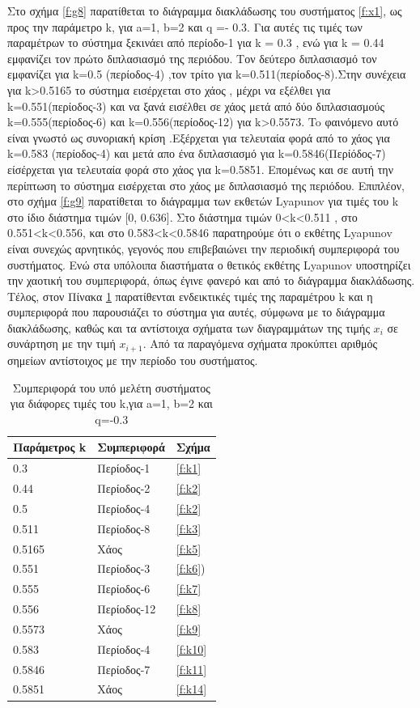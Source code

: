 Στο σχήμα \ref{f:g8} παρατίθεται το διάγραμμα διακλάδωσης του συστήματος \ref{f:x1}, ως προς την παράμετρο k, για a=1, b=2 και q =- 0.3. Για αυτές τις τιμές των παραμέτρων το σύστημα ξεκινάει από περίοδο-1 για k = 0.3 , ενώ για  k = 0.44 εμφανίζει τον πρώτο διπλασιασμό της περιόδου. Τον δεύτερο διπλασιασμό τον εμφανίζει για k=0.5 (περίοδος-4) ,τον τρίτο για k=0.511(περίοδος-8).Στην συνέχεια για k>0.5165 το σύστημα εισέρχεται στο χάος , μέχρι να εξέλθει  για k=0.551(περίοδος-3) και να ξανά εισέλθει σε χάος μετά από δύο διπλασιασμούς k=0.555(περίοδος-6) και k=0.556(περίοδος-12) για k>0.5573. To φαινόμενο αυτό είναι γνωστό ως συνοριακή κρίση .Εξέρχεται για τελευταία φορά από το χάος για k=0.583 (περίοδος-4) και μετά απο ένα διπλασιασμό  για k=0.5846(Περίόδος-7) είσέρχεται για τελευταία φορά στο χάος για k=0.5851.
Επομένως και σε αυτή την περίπτωση το σύστημα εισέρχεται στο χάος με διπλασιασμό της περιόδου. 
Επιπλέον, στο σχήμα \ref{f:g9} παρατίθεται το διάγραμμα των εκθετών Lyapunov για τιμές του k στο ίδιο διάστημα τιμών [0, 0.636].  Στο διάστημα τιμών   0<k<0.511 , στο 0.551<k<0.556, και στο 0.583<k<0.5846 παρατηρούμε ότι ο εκθέτης Lyapunov είναι συνεχώς αρνητικός, γεγονός που επιβεβαιώνει την περιοδική συμπεριφορά του συστήματος. Ενώ στα υπόλοιπα διαστήματα ο θετικός εκθέτης Lyapunov υποστηρίζει την χαοτική του συμπεριφορά, όπως έγινε φανερό και από το διάγραμμα διακλάδωσης.
Τέλος, στον Πίνακα \ref{tab:abc1} παρατίθενται ενδεικτικές τιμές της παραμέτρου k και η συμπεριφορά που παρουσιάζει το σύστημα για αυτές, σύμφωνα με το διάγραμμα διακλάδωσης, καθώς και τα αντίστοιχα σχήματα των διαγραμμάτων της τιμής \(x_i\) σε συνάρτηση με την τιμή \(x_{i+1}\). Από τα παραγόμενα σχήματα προκύπτει αριθμός σημείων αντίστοιχος με την περίοδο του συστήματος.
\begin{table}[h!]
	\centering
	\begin{tabular}{l | l | l}
		Παράμετρος k & Συμπεριφορά & Σχήμα\\
		\hline
		0.3 &  Περίοδος-1 & \ref{f:k1}\\
		0.44& Περίοδος-2 & \ref{f:k2}\\
		0.5& Περίοδος-4 & \ref{f:k2}\\
		0.511 &  Περίοδος-8 & \ref{f:k3}\\
		0.5165 & Χάος & \ref{f:k5}\\
		0.551 & Περίοδος-3 & \ref{f:k6})\\
		0.555 & Περίοδος-6 & \ref{f:k7}\\
		0.556 & Περίοδος-12 & \ref{f:k8}\\
		0.5573 & Χάος & \ref{f:k9}\\
		0.583& Περίοδος-4 & \ref{f:k10}\\
		0.5846 & Περίοδος-7 & \ref{f:k11}\\
		0.5851 & Χάος & \ref{f:k14}\\
	\end{tabular}
	\caption{ Συμπεριφορά του υπό μελέτη συστήματος για διάφορες τιμές του k,για a=1, b=2 και q=-0.3}
	\label{tab:abc1}
\end{table}

